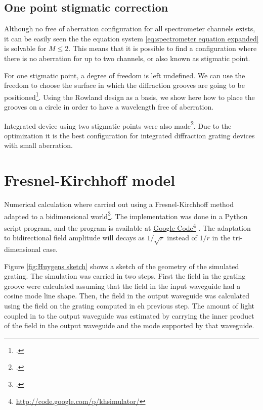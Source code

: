 \documentclass[12pt,twoside,english]{book}
\renewcommand{\~}{\perispomeni}%
\numberwithin{equation}{section}
\numberwithin{figure}{section}
\newcommand\fnurl[2]{%
 \href{#2}{#1}\footnote{\url{#2}}%
}
\begin{document}
\subsection{One point stigmatic correction}
Although no free of aberration configuration for all spectrometer channels exists, it can be easily seen the the equation system \ref{eq:spectrometer equation expanded} is solvable for $M\le2$. This means that it is possible to find a configuration where there is no aberration for up to two channels, or also known as stigmatic point.

For one stigmatic point, a degree of freedom is left undefined. We can use the freedom to choose the surface in which the diffraction grooves are going to be positioned\footcite{McGreer:1996p15}. Using the Rowland design as a basis, we show here how to place the grooves on a circle in order to have a wavelength free of aberration. 

Integrated device using two stigmatic points were also made\footcite{Horst:2009p1764,Gidon:1988p1765}. Due to the optimization it is the best configuration for integrated diffraction grating devices with small aberration.


\section{Fresnel-Kirchhoff model}
\label{section:Rayleigh-Huygens-model}

Numerical calculation where carried out using a Fresnel-Kirchhoff method adapted to a bidimensional world\footcite{Brouckaert:2007p82}. The implementation was done in a Python script program, and the program is available at \fnurl{Google Code}{http://code.google.com/p/khsimulator/}. The adaptation to bidirectional field amplitude will decays as $1/\sqrt{r}$ instead of $1/r$ in the tri-dimensional case.

Figure \ref{fig:Huygens sketch} shows a sketch of the geometry of the simulated grating. The simulation was carried in two steps. First the field in the grating groove were calculated assuming that the field in the input waveguide had a cosine mode line shape. Then, the field in the output waveguide was calculated using the field on the grating computed in eh previous step. The amount of light coupled in to the output waveguide was estimated by carrying the inner product of the field in the output waveguide and the mode supported by that waveguide.
\end{document}
